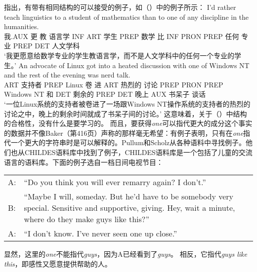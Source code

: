 \citet[]{PS2002a}指出，有带有相同结构的可以接受的例子，如（）中的例子所示：
\eal
\ex 
\gll I'd rather teach linguistics to a student of mathematics than to
one of any discipline in the humanities.\\
我.AUX 更 教 语言学 INF ART 学生 PREP 数学 比 INF PRON PREP  任何 专业 PREP DET 人文学科\\
\glt `我更愿意给数学专业的学生教语言学，而不是人文学科中的任何一个专业的学生。'
\ex 
\gll An advocate of Linux got into a heated discussion with one of
Windows NT and the rest of the evening was nerd talk.\\
ART 支持者 PREP Linux 卷 进 ART 热烈的 讨论 PREP PRON PREP Windows NT 和 DET 剩余的 PREP DET 晚上 AUX 书呆子 谈话\\
\glt `一位Linux系统的支持者被卷进了一场跟Windows NT操作系统的支持者的热烈的讨论之中，晚上的剩余时间就成了书呆子间的讨论。'
\zl
这意味着，关于（）中结构的合格性，没有什么是要学习的。
而且，要获得\emph{one}可以指代更大的成分这个事实的数据并不像Baker（第416页）声称的那样毫无希望：有例子表明，只有在\emph{one}指代一个更大的字符串时是可以解释的。Pullum和Scholz从各种语料中寻找例子。他们也从CHILDES语料库中找到了例子，CHILDES语料库是一个包括了儿童的交流语言的语料库\citep{MacWhinny95a-u}。下面的例子选自一档日间电视节目：
\eanoraggedright
\begin{tabular}[t]{@{}l@{~}p{11cm}}
A: & ``Do you think you will ever remarry again? I don't.''\\
B: & ``Maybe I will, someday. But he'd have to be somebody very special. Sensitive and supportive, giving. Hey, wait a minute, where
   do they make guys like this?''\\
A: & ``I don't know. I've never seen one up close.''\\
\end{tabular}
\z
\addlines
显然，这里的\emph{one}不能指代\emph{guys}，因为A已经看到了\emph{guys}。
相反，它指代\emph{guys like this}，即感性又愿意提供帮助的人。

